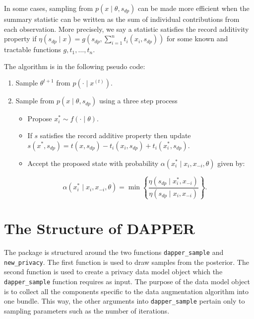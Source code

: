 In some cases, sampling from \(p(x \mid \theta, s_{dp})\) can be made more efficient
when the summary statistic can be written as the sum of individual
contributions from each observation. More precisely, we say a statistic satisfies
the record additivity property if \(\eta(s_{dp} \mid x) = g(s_{dp}, \sum_{i=1}^{n}t_i(x_i, s_{dp}))\)
for some known and tractable functions \(g, t_1, \ldots, t_n\).

The algorithm is in the following pseudo code:

\begin{enumerate}
\def\labelenumi{\arabic{enumi}.}
\tightlist
\item
  Sample \(\theta^{t+1}\) from \(p(\cdot \mid x^{(t)})\).
\item
  Sample from \(p(x \mid \theta, s_{dp})\) using a three step process

  \begin{itemize}
  \tightlist
  \item
    Propose \(x_{i}^{*} \sim f(\cdot \mid \theta)\).
  \item
    If \(s\) satisfies the record additive property then
    update \(s(x^*, s_{dp}) = t(x,s_{dp}) - t_i(x_i,s_{dp}) + t_{i}(x_i^*, s_{dp})\).
  \item
    Accept the proposed state with probability \(\alpha(x_i^* \mid x_i, x_{-i}, \theta)\)
    given by:
  \end{itemize}

  \[
     \alpha(x_i^* \mid x_i, x_{-i}, \theta) = \min \left\{ \dfrac{\eta(s_{dp} \mid x_i^*, x_{-i})}{\eta(s_{dp} \mid x_i, x_{-i})} \right\}.
   \]
\end{enumerate}

\hypertarget{the-structure-of-dapper}{%
\section{The Structure of DAPPER}\label{the-structure-of-dapper}}

The package is structured around the two functions \texttt{dapper\_sample} and
\texttt{new\_privacy}. The first function is used to draw samples from the
posterior. The second function is used to create a privacy data model object
which the \texttt{dapper\_sample} function requires as input. The purpose of the data model
object is to collect all the components specific to the data augmentation algorithm
into one bundle. This way, the other arguments into \texttt{dapper\_sample} pertain only
to sampling parameters such as the number of iterations.

